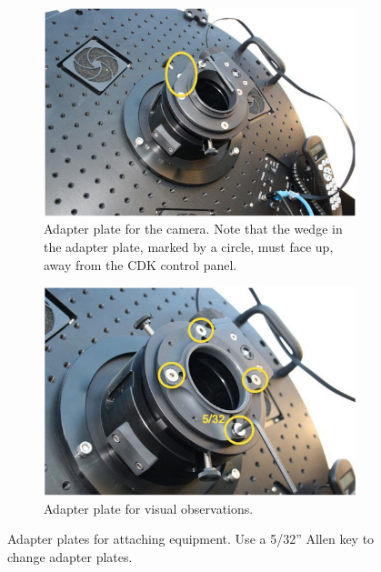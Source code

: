 \documentclass[a4paper, 11pt, fleqn]{memoir}
\begin{document}
\begin{figure}
    \centering
    \begin{subfigure}[t]{0.47\textwidth}
        \centering
        \includegraphics[width=\textwidth]{adapter-ccd}
        \caption{Adapter plate for the camera.
            Note that the wedge in the adapter plate, marked by a circle, must face up, away from the CDK control panel.
        }
        \label{fig:adapter-plate-camera}
    \end{subfigure}
    \begin{subfigure}[t]{0.47\textwidth}
        \centering
        \includegraphics[width=\textwidth]{adapter-visual}
        \caption{Adapter plate for visual observations.}
        \label{fig:adapter-plate-eyepiece}
    \end{subfigure}
    \caption{Adapter plates for attaching equipment.
        Use a 5/32'' Allen key to change adapter plates.
    }
\end{figure}
\end{document}

